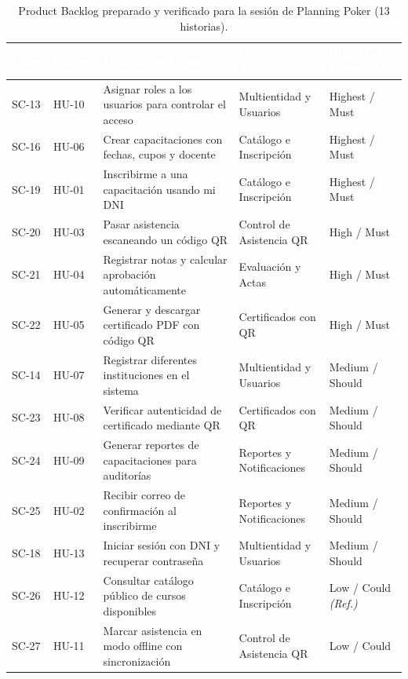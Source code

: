 \begin{table}[H]
\centering
\small
\renewcommand{\arraystretch}{1.2}
\caption{Product Backlog preparado y verificado para la sesión de Planning Poker (13 historias).}
\label{tab:backlog_preparado}
\begin{tabularx}{\textwidth}{P{1.4cm} P{1.4cm} Y P{3.8cm} C{2.6cm}}
\toprule
{}
\textcolor{white}{\textbf{Clave}} & \textcolor{white}{\textbf{Código}} & \textcolor{white}{\textbf{Historia de Usuario}} & \textcolor{white}{\textbf{Épica Asociada}} & \textcolor{white}{\textbf{Prioridad MoSCoW}} \\
\midrule
{}
SC-13 & HU-10 & Asignar roles a los usuarios para controlar el acceso & Multientidad y Usuarios & Highest / Must \\
SC-16 & HU-06 & Crear capacitaciones con fechas, cupos y docente & Catálogo e Inscripción & Highest / Must \\
SC-19 & HU-01 & Inscribirme a una capacitación usando mi DNI & Catálogo e Inscripción & Highest / Must \\
SC-20 & HU-03 & Pasar asistencia escaneando un código QR & Control de Asistencia QR & High / Must \\
SC-21 & HU-04 & Registrar notas y calcular aprobación automáticamente & Evaluación y Actas & High / Must \\
SC-22 & HU-05 & Generar y descargar certificado PDF con código QR & Certificados con QR & High / Must \\
SC-14 & HU-07 & Registrar diferentes instituciones en el sistema & Multientidad y Usuarios & Medium / Should \\
SC-23 & HU-08 & Verificar autenticidad de certificado mediante QR & Certificados con QR & Medium / Should \\
SC-24 & HU-09 & Generar reportes de capacitaciones para auditorías & Reportes y Notificaciones & Medium / Should \\
SC-25 & HU-02 & Recibir correo de confirmación al inscribirme & Reportes y Notificaciones & Medium / Should \\
SC-18 & HU-13 & Iniciar sesión con DNI y recuperar contraseña & Multientidad y Usuarios & Medium / Should \\
SC-26 & HU-12 & Consultar catálogo público de cursos disponibles & Catálogo e Inscripción & Low / Could \textit{(Ref.)} \\
SC-27 & HU-11 & Marcar asistencia en modo offline con sincronización & Control de Asistencia QR & Low / Could \\
\bottomrule
\end{tabularx}
\end{table}
